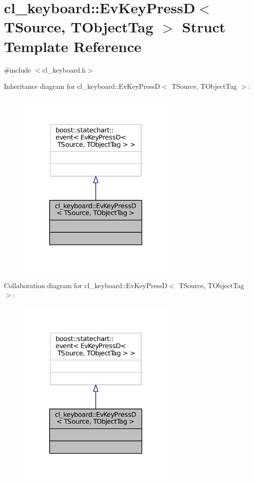 \hypertarget{structcl__keyboard_1_1EvKeyPressD}{}\section{cl\+\_\+keyboard\+:\+:Ev\+Key\+PressD$<$ T\+Source, T\+Object\+Tag $>$ Struct Template Reference}
\label{structcl__keyboard_1_1EvKeyPressD}


{\ttfamily \#include $<$cl\+\_\+keyboard.\+h$>$}



Inheritance diagram for cl\+\_\+keyboard\+:\+:Ev\+Key\+PressD$<$ T\+Source, T\+Object\+Tag $>$\+:
\nopagebreak
\begin{figure}[H]
\begin{center}
\leavevmode
\includegraphics[width=221pt]{structcl__keyboard_1_1EvKeyPressD__inherit__graph}
\end{center}
\end{figure}


Collaboration diagram for cl\+\_\+keyboard\+:\+:Ev\+Key\+PressD$<$ T\+Source, T\+Object\+Tag $>$\+:
\nopagebreak
\begin{figure}[H]
\begin{center}
\leavevmode
\includegraphics[width=221pt]{structcl__keyboard_1_1EvKeyPressD__coll__graph}
\end{center}
\end{figure}


